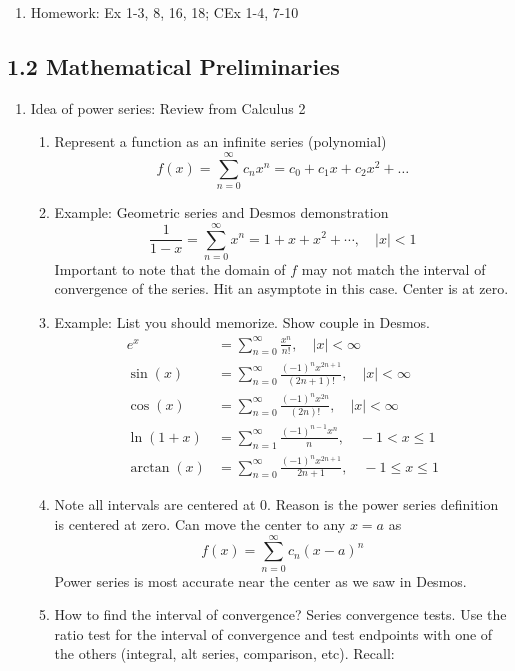\documentclass{article}
\theoremstyle{remark}
\begin{document}
\begin{enumerate}
\item Homework: Ex 1-3, 8, 16, 18; CEx 1-4, 7-10


\end{enumerate}

\subsection{1.2 Mathematical Preliminaries}


\begin{enumerate}
\item Idea of power series: Review from Calculus 2
\begin{enumerate}
\item Represent a function as an infinite series (polynomial)
\[
f(x) = \sum_{n=0}^{\infty} c_n x^n = c_0 + c_1 x + c_2 x^2 + \dots
\]
\item Example: Geometric series and Desmos demonstration
\[
\frac{1}{1-x} = \sum_{n=0}^{\infty} x^n = 1 + x + x^2 + \cdots, \quad |x|<1
\]
Important to note that the domain of $f$ may not match the interval of convergence of the series. Hit an asymptote in this case. Center is at zero.
\item Example: List you should memorize. Show couple in Desmos.
\begin{align*}
e^x &= \sum_{n=0}^{\infty} \frac{x^n}{n!}, \quad |x|<\infty \\
\sin(x) &= \sum_{n=0}^{\infty} \frac{(-1)^n x^{2n+1}}{(2n+1)!}, \quad |x|<\infty \\
\cos(x) &= \sum_{n=0}^{\infty} \frac{(-1)^n x^{2n}}{(2n)!}, \quad |x|<\infty \\
\ln(1+x) &= \sum_{n=1}^{\infty} \frac{(-1)^{n-1} x^{n}}{n}, \quad -1<x \leq 1 \\
\arctan(x) &= \sum_{n=0}^{\infty} \frac{(-1)^{n} x^{2n+1}}{2n+1}, \quad -1 \leq x \leq 1 
\end{align*}
\item Note all intervals are centered at 0. Reason is the power series definition is centered at zero. Can move the center to any $x=a$ as
\[
f(x) = \sum_{n=0}^{\infty} c_n (x-a)^n
\]
Power series is most accurate near the center as we saw in Desmos.
\item How to find the interval of convergence? Series convergence tests. Use the ratio test for the interval of convergence and test endpoints with one of the others (integral, alt series, comparison, etc).  Recall:

\end{enumerate}
\end{enumerate}
\end{document}
